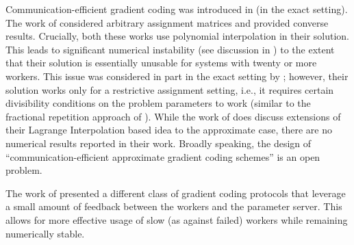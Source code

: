 \documentclass[journal,draftcls,onecolumn]{IEEEtran}
\theoremstyle{mystyle}
\newcommand{\aditya}[1]{\marginpar{+}{\bf Aditya's remark}: {\em #1}}
\begin{document}
Communication-efficient gradient coding was introduced in \cite{YeA18} (in the exact setting). The work of \cite{tayyebehM21} considered arbitrary assignment matrices and provided converse results. Crucially, both these works use polynomial interpolation in their solution. This leads to significant numerical instability \cite{Pan16} (see discussion in \cite{ramamoorthyMG24}) to the extent that their solution is essentially unusable for systems with twenty or more workers. This issue was considered in part in the exact setting by \cite{kadheKR20}; however, their solution works only for a restrictive assignment setting, i.e., it requires certain divisibility conditions on the problem parameters to work (similar to the fractional repetition approach of \cite{tandon_gradient}). While the work of \cite{tayyebehM21} does discuss extensions of their Lagrange Interpolation based idea to the approximate case, there are no numerical results reported in their work. %
Broadly speaking, the design of ``communication-efficient approximate gradient coding schemes'' is an open problem.

The work of \cite{ramamoorthyMG24} presented a different class of gradient coding protocols that leverage a small amount of feedback between the workers and the parameter server. This allows for more effective usage of slow (as against failed) workers while remaining numerically stable.

\end{document}
